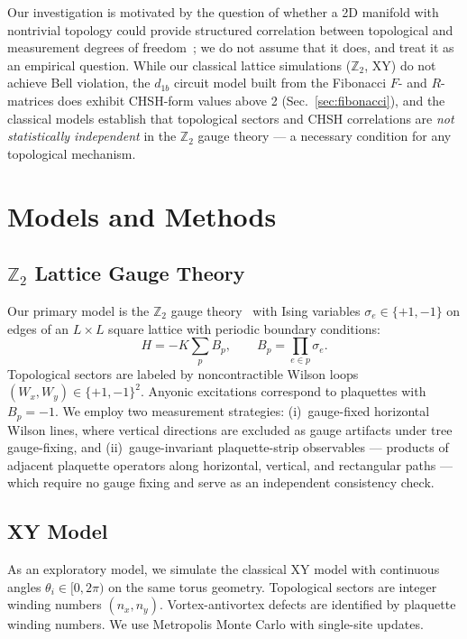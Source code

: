 \documentclass[aps,pra,twocolumn,superscriptaddress,showpacs,floatfix]{revtex4-2}
\newcommand{\Ztwo}{\mathbb{Z}_2}
\begin{document}
Our investigation is motivated by the question of whether a 2D manifold with
nontrivial topology could provide structured correlation between topological
and measurement degrees of freedom~\cite{Sayim2026chsh}; we do not assume that
it does, and treat it as an empirical question.
While our classical lattice simulations ($\Ztwo$, XY) do not achieve Bell
violation, the $d_{1b}$ circuit model built from the Fibonacci $F$- and
$R$-matrices does exhibit CHSH-form values above 2 (Sec.~\ref{sec:fibonacci}),
and the classical models establish
that topological sectors and CHSH correlations are \emph{not statistically
independent} in the $\Ztwo$ gauge theory --- a necessary condition for any
topological mechanism.

\section{Models and Methods}
\label{sec:methods}

\subsection{$\Ztwo$ Lattice Gauge Theory}

Our primary model is the $\Ztwo$ gauge theory~\cite{Wegner1971} with Ising
variables $\sigma_e \in \{+1,-1\}$ on edges of an $L \times L$ square lattice
with periodic boundary conditions:
\begin{equation}
  H = -K \sum_p B_p, \qquad B_p = \prod_{e \in p} \sigma_e.
  \label{eq:z2_hamiltonian}
\end{equation}
Topological sectors are labeled by noncontractible Wilson loops
$(W_x, W_y) \in \{+1,-1\}^2$. Anyonic excitations correspond to plaquettes with
$B_p = -1$. We employ two measurement strategies: (i)~gauge-fixed horizontal
Wilson lines, where vertical directions are excluded as gauge artifacts under tree
gauge-fixing, and (ii)~gauge-invariant plaquette-strip observables --- products of
adjacent plaquette operators along horizontal, vertical, and rectangular paths ---
which require no gauge fixing and serve as an independent consistency check.

\subsection{XY Model}

As an exploratory model, we simulate the classical XY model with continuous angles
$\theta_i \in [0, 2\pi)$ on the same torus geometry. Topological sectors are
integer winding numbers $(n_x, n_y)$. Vortex-antivortex defects are identified by
plaquette winding numbers. We use Metropolis Monte Carlo with single-site updates.
\end{document}
